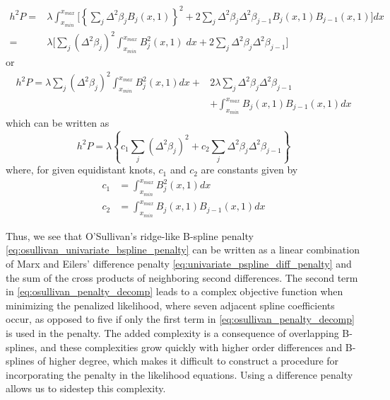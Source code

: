 \documentclass[12pt]{article}
\begin{document}
\begin{align}
h^2 P = {} & \lambda \int_{x_{min}}^{x_{max}} \bigg[ \left\{ \sum_{j}  \Delta^2 \beta_j  B_j\left(x,1\right)  \right\}^2  + 2 \sum_{j}\Delta^2 \beta_j\Delta^2 \beta_{j-1}B_j\left(x,1\right)B_{j-1}\left(x,1\right) \bigg] dx \nonumber \\ 
= {} & \lambda \bigg[ \sum_j \left( \Delta^2\beta_j \right)^2 \int_{x_{min}}^{x_{max}} B_j^2\left(x,1\right)\;dx + 2 \sum_j \Delta^2 \beta_j\Delta^2 \beta_{j-1} \bigg]
\end{align}
\noindent
or
\begin{align}
h^2 P = \lambda \sum_j \left( \Delta^2\beta_j \right)^2 \int_{x_{min}}^{x_{max}} B_j^2\left(x,1\right) dx + {} & 2\lambda \sum_j \Delta^2 \beta_j \Delta^2 \beta_{j-1}  \nonumber \\ 
{} &+\int_{x_{min}}^{x_{max}} B_j\left(x,1\right)B_{j-1}\left(x,1\right) dx
\end{align}
\noindent
which can be written as
\begin{equation} \label{eq:osullivan_penalty_decomp}
h^2 P = \lambda\left\{c_1 \sum_j\left( \Delta^2 \beta_j\right)^2 + c_2 \sum_j\Delta^2 \beta_j\Delta^2 \beta_{j-1} \right\}
\end{equation}
\noindent
where, for given equidistant knots, $c_1$ and $c_2$ are constants given by
\begin{equation}
\begin{split}
c_1 & =   \int_{x_{min}}^{x_{max}} B_j^2\left(x,1\right) dx\\
c_2 & = \int_{x_{min}}^{x_{max}} B_j\left(x,1\right)B_{j-1}\left(x,1\right) dx
\end{split}
\end{equation}

Thus, we see that O'Sullivan's ridge-like B-spline penalty \ref{eq:osullivan_univariate_bspline_penalty} can be written as a linear combination of Marx and Eilers' difference penalty \ref{eq:univariate_pspline_diff_penalty} and the sum of the cross products of neighboring second differences. The second term in \ref{eq:osullivan_penalty_decomp} leads to a complex objective function when minimizing the penalized likelihood, where seven adjacent spline coefficients occur, as opposed to five if only the first term in \ref{eq:osullivan_penalty_decomp} is used in the penalty. The added complexity is a consequence of overlapping B-splines, and these complexities grow quickly with higher order differences and B-splines of higher degree, which makes it difficult to construct a procedure for incorporating the penalty in the likelihood equations. Using a difference penalty allows us to sidestep this complexity.
\end{document}
